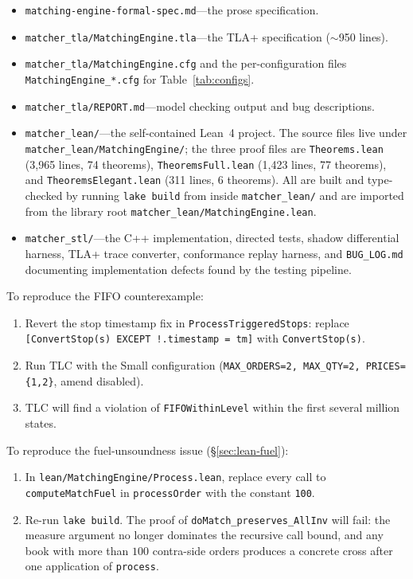 \documentclass[11pt,a4paper]{article}
\begin{document}
\begin{itemize}[nosep]
\item \texttt{matching-engine-formal-spec.md}---the prose specification.
\item \texttt{matcher\_tla/MatchingEngine.tla}---the TLA+ specification
      ($\sim$950 lines).
\item \texttt{matcher\_tla/MatchingEngine.cfg} and the
      per-configuration files \texttt{MatchingEngine\_*.cfg} for
      Table~\ref{tab:configs}.
\item \texttt{matcher\_tla/REPORT.md}---model checking output and bug
      descriptions.
\item \texttt{matcher\_lean/}---the self-contained Lean~4 project.
      The source files live under \texttt{matcher\_lean/MatchingEngine/};
      the three proof files are \texttt{Theorems.lean} (3{,}965 lines,
      74 theorems), \texttt{TheoremsFull.lean} (1{,}423 lines,
      77 theorems), and \texttt{TheoremsElegant.lean} (311 lines,
      6 theorems). All are built and type-checked by running
      \texttt{lake build} from inside \texttt{matcher\_lean/} and are
      imported from the library root \texttt{matcher\_lean/MatchingEngine.lean}.
\item \texttt{matcher\_stl/}---the C++ implementation, directed tests,
      shadow differential harness, TLA+ trace converter, conformance
      replay harness, and \texttt{BUG\_LOG.md} documenting implementation
      defects found by the testing pipeline.
\end{itemize}

To reproduce the FIFO counterexample:
\begin{enumerate}[nosep]
\item Revert the stop timestamp fix in \texttt{ProcessTriggeredStops}:
      replace \texttt{[ConvertStop(s) EXCEPT !.timestamp = tm]} with
      \texttt{ConvertStop(s)}.
\item Run TLC with the Small configuration
      (\texttt{MAX\_ORDERS=2, MAX\_QTY=2, PRICES=\{1,2\}}, amend
      disabled).
\item TLC will find a violation of \texttt{FIFOWithinLevel} within the
      first several million states.
\end{enumerate}

To reproduce the fuel-unsoundness issue (\S\ref{sec:lean-fuel}):
\begin{enumerate}[nosep]
\item In \texttt{lean/MatchingEngine/Process.lean}, replace every call to
      \texttt{computeMatchFuel} in \texttt{processOrder} with the
      constant \texttt{100}.
\item Re-run \texttt{lake build}. The proof of
      \texttt{doMatch\_preserves\_AllInv} will fail: the measure
      argument no longer dominates the recursive call bound, and any
      book with more than $100$ contra-side orders produces a concrete
      cross after one application of \texttt{process}.
\end{enumerate}
\end{document}
